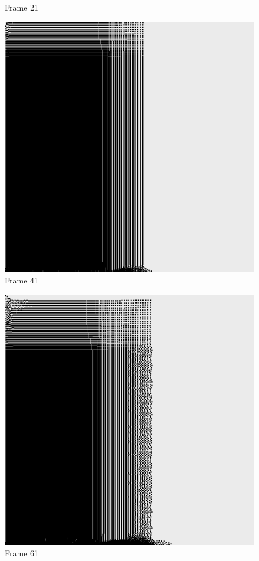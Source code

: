 \documentclass[a4paper, 12pt, oneside]{book}
\begin{document}
\begin{figure}[!ht]
\begin{center}
            Frame 21
        \end{center}
    \endminipage
    \hfill
        \begin{center}
            \includegraphics[width=\linewidth]{images/test_case_2/41.png}
            Frame 41
        \end{center}
    \endminipage
    \hfill
        \begin{center}
            \includegraphics[width=\linewidth]{images/test_case_2/61.png}
            Frame 61
        \end{center}
    \endminipage
    \hfill


\end{figure}
\end{document}
